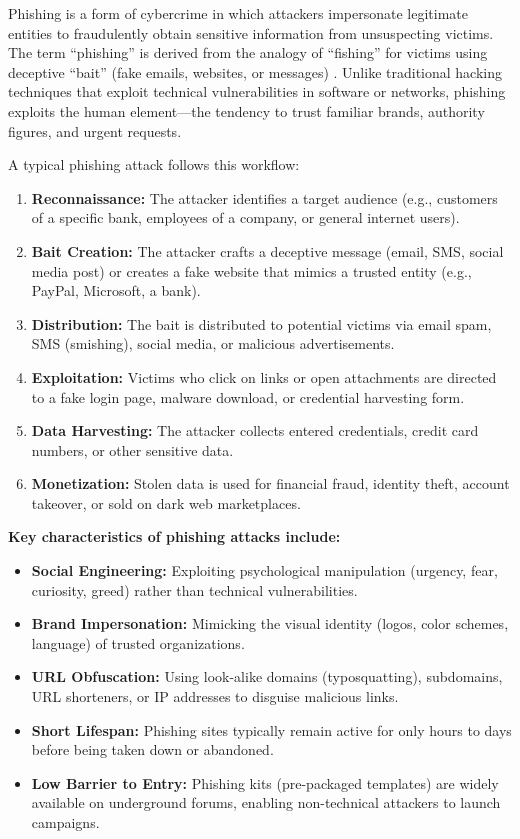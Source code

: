Phishing is a form of cybercrime in which attackers impersonate
legitimate entities to fraudulently obtain sensitive information from
unsuspecting victims. The term ``phishing'' is derived from the analogy
of ``fishing'' for victims using deceptive ``bait'' (fake emails,
websites, or messages) \cite{hong2012}. Unlike traditional hacking techniques
that exploit technical vulnerabilities in software or networks, phishing
exploits the human element---the tendency to trust familiar brands,
authority figures, and urgent requests.

A typical phishing attack follows this workflow:

\begin{enumerate}

\item
  \textbf{Reconnaissance:} The attacker identifies a target audience
  (e.g., customers of a specific bank, employees of a company, or
  general internet users).
\item
  \textbf{Bait Creation:} The attacker crafts a deceptive message
  (email, SMS, social media post) or creates a fake website that mimics
  a trusted entity (e.g., PayPal, Microsoft, a bank).
\item
  \textbf{Distribution:} The bait is distributed to potential victims
  via email spam, SMS (smishing), social media, or malicious
  advertisements.
\item
  \textbf{Exploitation:} Victims who click on links or open attachments
  are directed to a fake login page, malware download, or credential
  harvesting form.
\item
  \textbf{Data Harvesting:} The attacker collects entered credentials,
  credit card numbers, or other sensitive data.
\item
  \textbf{Monetization:} Stolen data is used for financial fraud,
  identity theft, account takeover, or sold on dark web marketplaces.
\end{enumerate}

\textbf{Key characteristics of phishing attacks include:}

\begin{itemize}
\item
  \textbf{Social Engineering:} Exploiting psychological manipulation
  (urgency, fear, curiosity, greed) rather than technical
  vulnerabilities.
\item
  \textbf{Brand Impersonation:} Mimicking the visual identity (logos,
  color schemes, language) of trusted organizations.
\item
  \textbf{URL Obfuscation:} Using look-alike domains (typosquatting),
  subdomains, URL shorteners, or IP addresses to disguise malicious
  links.
\item
  \textbf{Short Lifespan:} Phishing sites typically remain active for
  only hours to days before being taken down or abandoned.
\item
  \textbf{Low Barrier to Entry:} Phishing kits (pre-packaged templates)
  are widely available on underground forums, enabling non-technical
  attackers to launch campaigns.
\end{itemize}

